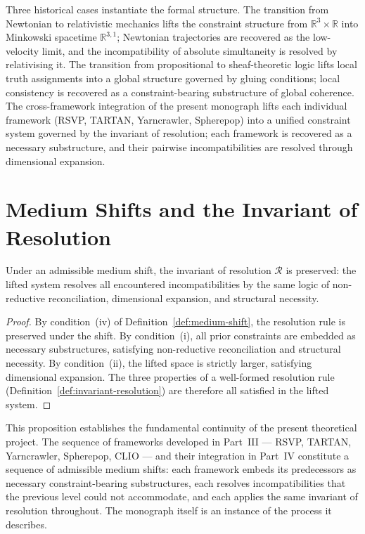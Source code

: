 \documentclass[11pt,openany]{book}
\begin{document}
Three historical cases instantiate the formal structure.
The transition from Newtonian to relativistic mechanics
lifts the constraint structure from
$\mathbb{R}^3 \times \mathbb{R}$ into Minkowski spacetime
$\mathbb{R}^{3,1}$; Newtonian trajectories are recovered
as the low-velocity limit, and the incompatibility of
absolute simultaneity is resolved by relativising it.  The
transition from propositional to sheaf-theoretic logic
lifts local truth assignments into a global structure
governed by gluing conditions; local consistency is
recovered as a constraint-bearing substructure of global
coherence.  The cross-framework integration of the present
monograph lifts each individual framework (RSVP, TARTAN,
Yarncrawler, Spherepop) into a unified constraint system
governed by the invariant of resolution; each framework
is recovered as a necessary substructure, and their
pairwise incompatibilities are resolved through dimensional
expansion.

\section{Medium Shifts and the Invariant of Resolution}
\label{sec:medium-resolution}

\begin{proposition}
\label{prop:resolution-preserved}
Under an admissible medium shift, the invariant of
resolution $\mathcal{R}$ is preserved: the lifted system
resolves all encountered incompatibilities by the same
logic of non-reductive reconciliation, dimensional
expansion, and structural necessity.
\end{proposition}

\begin{proof}
By condition~(iv) of Definition~\ref{def:medium-shift},
the resolution rule is preserved under the shift.  By
condition~(i), all prior constraints are embedded as
necessary substructures, satisfying non-reductive
reconciliation and structural necessity.  By condition~(ii),
the lifted space is strictly larger, satisfying dimensional
expansion.  The three properties of a well-formed
resolution rule (Definition~\ref{def:invariant-resolution})
are therefore all satisfied in the lifted system.
\end{proof}

This proposition establishes the fundamental continuity
of the present theoretical project.  The sequence of
frameworks developed in Part~III --- RSVP, TARTAN,
Yarncrawler, Spherepop, CLIO --- and their integration in
Part~IV constitute a sequence of admissible medium shifts:
each framework embeds its predecessors as necessary
constraint-bearing substructures, each resolves
incompatibilities that the previous level could not
accommodate, and each applies the same invariant of
resolution throughout.  The monograph itself is an instance
of the process it describes.
\end{document}
